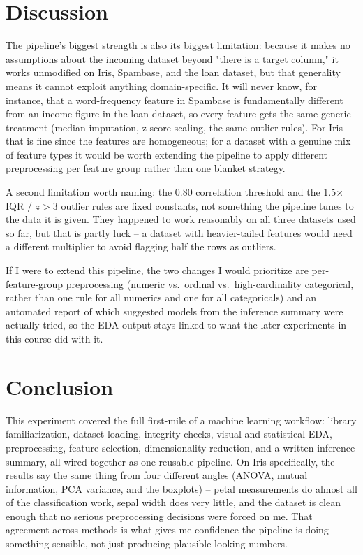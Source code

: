 \documentclass[11pt,a4paper]{article}
\begin{document}
\section{Discussion}
The pipeline's biggest strength is also its biggest limitation: because it makes no assumptions about the incoming dataset beyond "there is a target column," it works unmodified on Iris, Spambase, and the loan dataset, but that generality means it cannot exploit anything domain-specific. It will never know, for instance, that a word-frequency feature in Spambase is fundamentally different from an income figure in the loan dataset, so every feature gets the same generic treatment (median imputation, z-score scaling, the same outlier rules). For Iris that is fine since the features are homogeneous; for a dataset with a genuine mix of feature types it would be worth extending the pipeline to apply different preprocessing per feature group rather than one blanket strategy.

A second limitation worth naming: the 0.80 correlation threshold and the 1.5$\times$IQR / $z>3$ outlier rules are fixed constants, not something the pipeline tunes to the data it is given. They happened to work reasonably on all three datasets used so far, but that is partly luck -- a dataset with heavier-tailed features would need a different multiplier to avoid flagging half the rows as outliers.

If I were to extend this pipeline, the two changes I would prioritize are per-feature-group preprocessing (numeric vs.\ ordinal vs.\ high-cardinality categorical, rather than one rule for all numerics and one for all categoricals) and an automated report of which suggested models from the inference summary were actually tried, so the EDA output stays linked to what the later experiments in this course did with it.

\section{Conclusion}
This experiment covered the full first-mile of a machine learning workflow: library familiarization, dataset loading, integrity checks, visual and statistical EDA, preprocessing, feature selection, dimensionality reduction, and a written inference summary, all wired together as one reusable pipeline. On Iris specifically, the results say the same thing from four different angles (ANOVA, mutual information, PCA variance, and the boxplots) -- petal measurements do almost all of the classification work, sepal width does very little, and the dataset is clean enough that no serious preprocessing decisions were forced on me. That agreement across methods is what gives me confidence the pipeline is doing something sensible, not just producing plausible-looking numbers.
\end{document}
